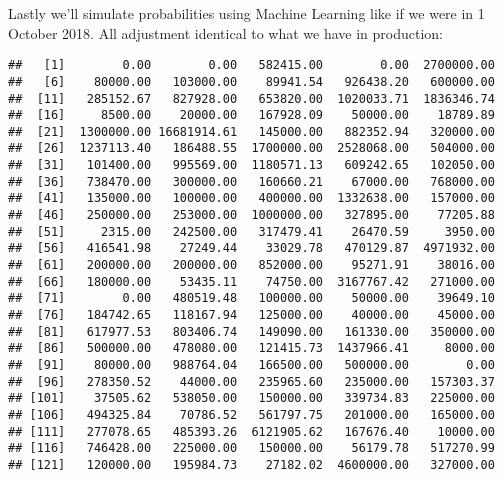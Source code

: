\documentclass[]{article}
\newenvironment{Shaded}{\begin{snugshade}}{\end{snugshade}}
\newcommand{\CommentTok}[1]{\textcolor[rgb]{0.56,0.35,0.01}{\textit{#1}}}
\newcommand{\DecValTok}[1]{\textcolor[rgb]{0.00,0.00,0.81}{#1}}
\newcommand{\NormalTok}[1]{#1}
\newcommand{\OperatorTok}[1]{\textcolor[rgb]{0.81,0.36,0.00}{\textbf{#1}}}
\newcommand{\StringTok}[1]{\textcolor[rgb]{0.31,0.60,0.02}{#1}}
\begin{document}
Lastly we'll simulate probabilities using Machine Learning like if we
were in 1 October 2018. All adjustment identical to what we have in
production:

\begin{Shaded}
\end{Shaded}

\begin{verbatim}
##   [1]        0.00        0.00   582415.00        0.00  2700000.00
##   [6]    80000.00   103000.00    89941.54   926438.20   600000.00
##  [11]   285152.67   827928.00   653820.00  1020033.71  1836346.74
##  [16]     8500.00    20000.00   167928.09    50000.00    18789.89
##  [21]  1300000.00 16681914.61   145000.00   882352.94   320000.00
##  [26]  1237113.40   186488.55  1700000.00  2528068.00   504000.00
##  [31]   101400.00   995569.00  1180571.13   609242.65   102050.00
##  [36]   738470.00   300000.00   160660.21    67000.00   768000.00
##  [41]   135000.00   100000.00   400000.00  1332638.00   157000.00
##  [46]   250000.00   253000.00  1000000.00   327895.00    77205.88
##  [51]     2315.00   242500.00   317479.41    26470.59     3950.00
##  [56]   416541.98    27249.44    33029.78   470129.87  4971932.00
##  [61]   200000.00   200000.00   852000.00    95271.91    38016.00
##  [66]   180000.00    53435.11    74750.00  3167767.42   271000.00
##  [71]        0.00   480519.48   100000.00    50000.00    39649.10
##  [76]   184742.65   118167.94   125000.00    40000.00    45000.00
##  [81]   617977.53   803406.74   149090.00   161330.00   350000.00
##  [86]   500000.00   478080.00   121415.73  1437966.41     8000.00
##  [91]    80000.00   988764.04   166500.00   500000.00        0.00
##  [96]   278350.52    44000.00   235965.60   235000.00   157303.37
## [101]    37505.62   538050.00   150000.00   339734.83   225000.00
## [106]   494325.84    70786.52   561797.75   201000.00   165000.00
## [111]   277078.65   485393.26  6121905.62   167676.40    10000.00
## [116]   746428.00   225000.00   150000.00    56179.78   517270.99
## [121]   120000.00   195984.73    27182.02  4600000.00   327000.00

\end{verbatim}
\end{document}
